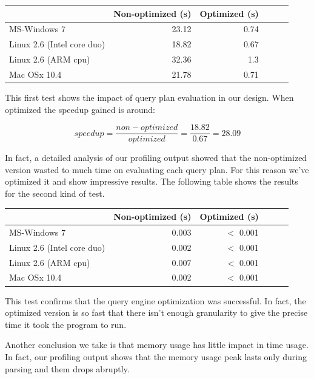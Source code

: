\documentclass[a4paper]{report}
\begin{document}
	\begin{center}
  			\begin{tabular}{ | l | r | r | r | r | r | }
			    \hline
				       	       		     			 & Non-optimized (s) & Optimized (s)\\ \hline
				    MS-Windows 7   			&  23.12  & 0.74  \\ \hline
				    Linux 2.6 (Intel core duo) 	&  18.82  & 0.67  \\ \hline
				    Linux 2.6 (ARM cpu)   		&  32.36  & 1.3 \\ \hline
				    Mac OSx 10.4   			&  21.78  & 0.71 \\ 
			    \hline
			\end{tabular}		   
	\end{center}

	This first test shows the impact of query plan evaluation in our design. When optimized the speedup gained is around:
	
		$$speedup = \frac{non-optimized}{optimized} = \frac{18.82}{0.67} = 28.09$$

	In fact, a detailed analysis of our profiling output showed that the non-optimized version wasted to much time on evaluating each query plan. For this reason we've optimized it and show impressive results. The following 
	table shows the results for the second kind of test.
	
	\begin{center}
  			\begin{tabular}{ | l | r | r | r | r | r | }
			    \hline
				       	       		     			 & Non-optimized (s) & Optimized (s)\\ \hline
				    MS-Windows 7   			&  0.003  & $<$ 0.001  \\ \hline
				    Linux 2.6 (Intel core duo) 	&  0.002  & $<$ 0.001  \\ \hline
				    Linux 2.6 (ARM cpu)   		&  0.007  & $<$ 0.001 \\ \hline
				    Mac OSx 10.4   			&  0.002  & $<$ 0.001 \\ 
			    \hline
			\end{tabular}		   
	\end{center}
	
	This test confirms that the query engine optimization was successful. In fact, the optimized version is so fast that there isn't enough granularity to give the precise time it took the program to run.
	
	Another conclusion we take is that memory usage has little impact in time usage. In fact, our profiling output shows that the memory usage peak lasts only during parsing and them drops abruptly. 
\end{document}
